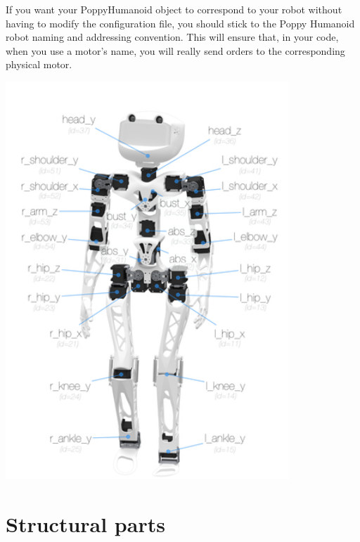 \documentclass{article}
\begin{document}
If you want your PoppyHumanoid object to correspond to your robot without having to modify the configuration file, you should stick to the Poppy Humanoid robot naming and addressing convention. This will ensure that, in your code, when you use a motor's name, you will really send orders to the corresponding physical motor.
\begin{center}
  \includegraphics[width=0.8\textwidth]{img/motor_naming_convention}
 \end{center}
 
 
 \section{Structural parts}
 \label{structural-parts}
\end{document}
